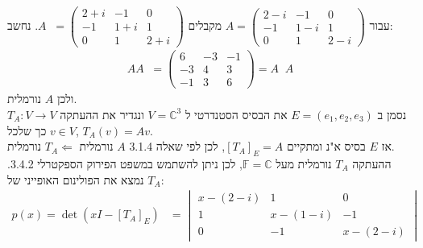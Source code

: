 \documentclass{article}
\def\complex{\mathbb{C}}
\def\field{\mathbb{F}}
\DeclareMathOperator{\adj}{^\ast}
\begin{document}
עבור $A=\begin{pmatrix}
        2-i & -1  & 0   \\
        -1  & 1-i & 1   \\
        0   & 1   & 2-i
    \end{pmatrix}$ מקבלים $A\adj = \begin{pmatrix}
        2+i & -1  & 0   \\
        -1  & 1+i & 1   \\
        0   & 1   & 2+i
    \end{pmatrix}$. נחשב:
\begin{align*}
    AA \adj = \begin{pmatrix}
                  6  & -3 & -1 \\
                  -3 & 4  & 3  \\
                  -1 & 3  & 6
              \end{pmatrix} = A \adj A
\end{align*}
ולכן $A$ נורמלית. \\
נסמן ב $E=(e_1, e_2, e_3)$ את הבסיס הסטנדרטי ל $V=\complex^3$ ונגדיר את ההעתקה $T_A: V \rightarrow V$ כך שלכל $v\in V$, $T_A(v)=Av$. \\
אז $E$ בסיס א"נ ומתקיים $[T_A]_E=A$, לכן לפי שאלה 3.1.4 $A$ נורמלית $T_A\Leftarrow$ נורמלית.\\
ההעתקה $T_A$ נורמלית מעל $\field=\complex$, לכן ניתן להשתמש במשפט הפירוק הספקטרלי 3.4.2. נמצא את הפולינום האופייני של $T_A$:
\begin{align*}
    p(x)=\det(xI-[T_A]_E) & =\begin{vmatrix}
                                 x-(2-i) & 1       & 0       \\
                                 1       & x-(1-i) & -1      \\
                                 0       & -1      & x-(2-i)
                             \end{vmatrix}
\end{align*}
\end{document}
